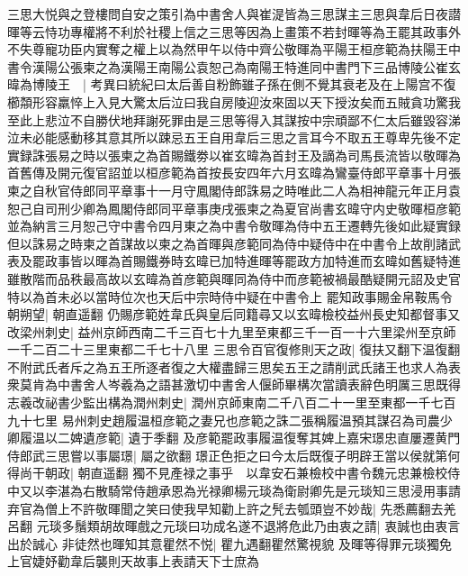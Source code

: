 三思大悦與之登樓問自安之策引為中書舍人與崔湜皆為三思謀主三思與韋后日夜譛暉等云恃功專權將不利於社稷上信之三思等因為上畫策不若封暉等為王罷其政事外不失尊寵功臣内實奪之權上以為然甲午以侍中齊公敬暉為平陽王桓彦範為扶陽王中書令漢陽公張柬之為漢陽王南陽公袁恕己為南陽王特進同中書門下三品博陵公崔玄暐為博陵王　|{
	考異曰統紀曰太后善自粉飾雖子孫在側不覺其衰老及在上陽宫不復櫛頮形容羸悴上入見大驚太后泣曰我自房陵迎汝來固以天下授汝矣而五賊貪功驚我至此上悲泣不自勝伏地拜謝死罪由是三思等得入其謀按中宗頑鄙不仁太后雖毀容涕泣未必能感動移其意其所以踈忌五王自用韋后三思之言耳今不取五王尊卑先後不定實録誅張易之時以張柬之為首賜鐵劵以崔玄暐為首封王及謫為司馬長流皆以敬暉為首舊傳及開元復官詔並以桓彦範為首按長安四年六月玄暐為鸞臺侍郎平章事十月張柬之自秋官侍郎同平章事十一月守鳳閣侍郎誅易之時唯此二人為相神龍元年正月袁恕己自司刑少卿為鳳閣侍郎同平章事庚戌張柬之為夏官尚書玄暐守内史敬暉桓彦範並為納言三月恕己守中書令四月東之為中書令敬暉為侍中五王遷轉先後如此疑實録但以誅易之時柬之首謀故以柬之為首暉與彦範同為侍中疑侍中在中書令上故削諸武表及罷政事皆以暉為首賜鐵券時玄暐已加特進暉等罷政方加特進而玄暐如舊疑特進雖散階而品秩最高故以玄暐為首彦範與暉同為侍中而彦範被禍最酷疑開元詔及史官特以為首未必以當時位次也天后中宗時侍中疑在中書令上}
罷知政事賜金帛鞍馬令朝朔望|{
	朝直遥翻}
仍賜彦範姓韋氏與皇后同籍尋又以玄暐檢校益州長史知都督事又改梁州刺史|{
	益州京師西南二千三百七十九里至東都三千一百一十六里梁州至京師一千二百二十三里東都二千七十八里}
三思令百官復修則天之政|{
	復扶又翻下温復翻}
不附武氏者斥之為五王所逐者復之大權盡歸三思矣五王之請削武氏諸王也求人為表衆莫肯為中書舍人岑羲為之語甚激切中書舍人偃師畢構次當讀表辭色明厲三思既得志羲改祕書少監出構為潤州刺史|{
	潤州京師東南二千八百二十一里至東都一千七百九十七里}
易州刺史趙履温桓彦範之妻兄也彦範之誅二張稱履温預其謀召為司農少卿履温以二婢遺彦範|{
	遺于季翻}
及彦範罷政事履温復奪其婢上嘉宋璟忠直屢遷黄門侍郎武三思嘗以事屬璟|{
	屬之欲翻}
璟正色拒之曰今太后既復子明辟王當以侯就第何得尚干朝政|{
	朝直遥翻}
獨不見產禄之事乎　以韋安石兼檢校中書令魏元忠兼檢校侍中又以李湛為右散騎常侍趙承恩為光禄卿楊元琰為衛尉卿先是元琰知三思浸用事請弃官為僧上不許敬暉聞之笑曰使我早知勸上許之髠去瓠頭豈不妙哉|{
	先悉薦翻去羌呂翻}
元琰多鬚類胡故暉戲之元琰曰功成名遂不退將危此乃由衷之請|{
	衷誠也由衷言出於誠心}
非徒然也暉知其意瞿然不悦|{
	瞿九遇翻瞿然驚視貌}
及暉等得罪元琰獨免上官婕妤勸韋后襲則天故事上表請天下士庶為

